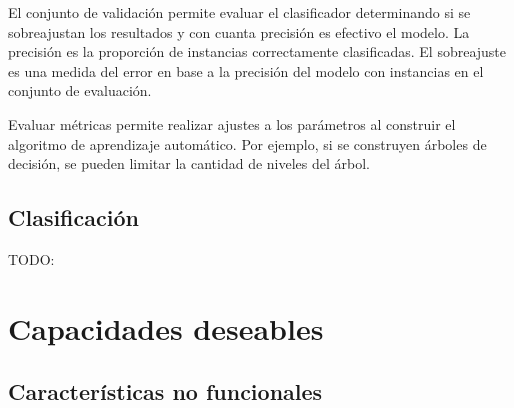 El conjunto de validación permite evaluar el clasificador determinando
si se sobreajustan los resultados y con cuanta precisión es efectivo
el modelo. La precisión es la proporción de instancias correctamente
clasificadas. El sobreajuste es una medida del error en base a la
precisión del modelo con instancias en el conjunto de evaluación.

Evaluar métricas permite realizar ajustes a los parámetros al construir
el algoritmo de aprendizaje automático. Por ejemplo, si se construyen
árboles de decisión, se pueden limitar la cantidad de niveles del
árbol.

\subsection{Clasificación}

TODO:

\section{Capacidades deseables}

\subsection{Características no funcionales}

